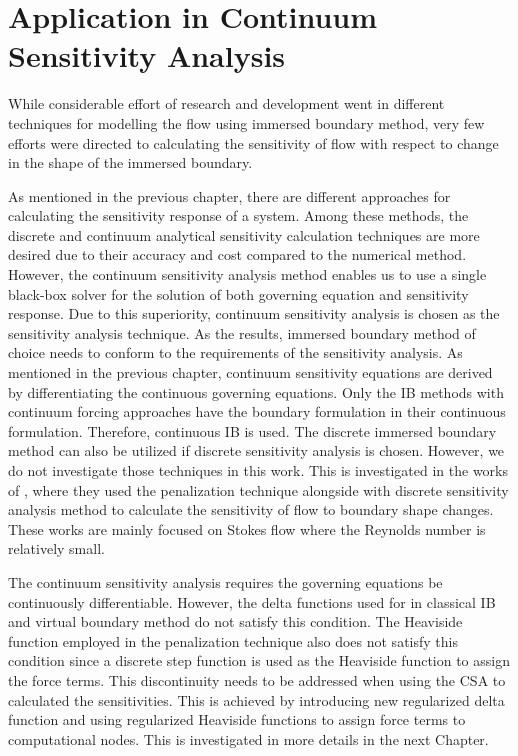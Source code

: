 \section{Application in Continuum Sensitivity Analysis}
While considerable effort of research and development went in different techniques for modelling the flow using immersed boundary method, very few efforts were directed to calculating the sensitivity of flow with respect to change in the shape of the immersed boundary.

As mentioned in the previous chapter, there are different approaches for calculating the sensitivity response of a system. Among these methods, the discrete and continuum analytical sensitivity calculation techniques are more desired due to their accuracy and cost compared to the numerical method. However, the continuum sensitivity analysis method enables us to use a single black-box solver for the solution of both governing equation and sensitivity response. Due to this superiority, continuum sensitivity analysis is chosen as the sensitivity analysis technique. As the results, immersed boundary method of choice needs to conform to the requirements of the sensitivity analysis. As mentioned in the previous chapter, continuum sensitivity equations are derived by differentiating the continuous governing equations. Only the IB methods with continuum forcing approaches have the boundary formulation in their continuous formulation. Therefore, continuous IB is used. The discrete immersed boundary method can also be utilized if discrete sensitivity analysis is chosen. However, we do not investigate those techniques in this work. This is investigated in the works of \cite{kreissl2011explicit, borrvall2003topology, challis2009level}, where they used the penalization technique alongside with discrete sensitivity analysis method to calculate the sensitivity of flow to boundary shape changes. These works are mainly focused on Stokes flow where the Reynolds number is relatively small.

The continuum sensitivity analysis requires the governing equations be continuously differentiable. However, the delta functions used for in classical IB and virtual boundary method do not satisfy this condition. The Heaviside function employed in the penalization technique also does not satisfy this condition since a discrete step function is used as the Heaviside function to assign the force terms. This discontinuity needs to be addressed when using the CSA to calculated the sensitivities. This is achieved by introducing new regularized delta function and using regularized Heaviside functions to assign force terms to computational nodes. This is investigated in more details in the next Chapter.

